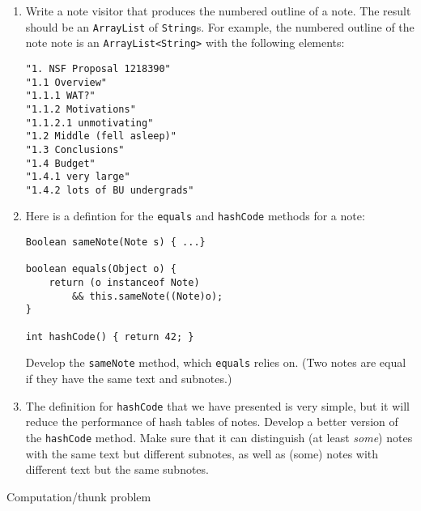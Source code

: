\documentclass[12pt]{article}                   %
\def\pts#1{\marginpar{\footnotesize \raggedright  \fbox{#1 {\sc Points}}}}
\begin{document}
\begin{problem}
\begin{enumerate}
\newpage

\noindent
\item Write a note visitor that produces the numbered outline of a
  note.  The result should be an \texttt{ArrayList} of
  \texttt{String}s.  For example, the numbered outline of the note
  note is an \texttt{ArrayList<String>} with the following elements:

\begin{verbatim}
"1. NSF Proposal 1218390"
"1.1 Overview"
"1.1.1 WAT?"
"1.1.2 Motivations"
"1.1.2.1 unmotivating"
"1.2 Middle (fell asleep)"
"1.3 Conclusions"
"1.4 Budget"
"1.4.1 very large"
"1.4.2 lots of BU undergrads"
\end{verbatim}

\ifrubric
\else
{}
\fi
\newpage

\noindent
\item Here is a defintion for the \texttt{equals} and \texttt{hashCode}
methods for a note:

\begin{verbatim}
Boolean sameNote(Note s) { ...}

boolean equals(Object o) {
    return (o instanceof Note) 
        && this.sameNote((Note)o);
}

int hashCode() { return 42; }
\end{verbatim}

\noindent
Develop the \texttt{sameNote} method, which \texttt{equals} relies on.
(Two notes are equal if they have the same text and subnotes.)

\ifrubric
\else
{}
\fi
\newpage

\noindent
\item The definition for \texttt{hashCode} that we have presented is
  very simple, but it will reduce the performance of hash tables of
  notes.  Develop a better version of the \texttt{hashCode} method.
  Make sure that it can distinguish (at least \emph{some}) notes with
  the same text but different subnotes, as well as (some)
  notes with different text but the same subnotes.

\ifrubric
\else
{}
\fi
\newpage
\newpage
\end{enumerate}
\end{problem}



\begin{problem} \pts{20}

Computation/thunk problem

\ifrubric
\else
{}
\fi
\newpage
\newpage

\end{problem}

\ifrubric
\else
{}
\fi
\newpage


\end{document}
